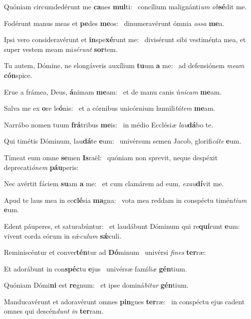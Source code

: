 \item Quóniam circumdedérunt me \textbf{ca}nes \textbf{mul}ti:~\psstar{} concílium malignánti\textit{um} \textit{ob}\textbf{sé}dit me.
\item Fodérunt manus meas et \textbf{pe}des \textbf{me}os:~\psstar{} dinumeravérunt ómnia \textit{ossa} \textbf{me}a.
\item Ipsi vero consideravérunt et \textbf{in}spe\textbf{xé}runt me:~\psstar{} divisérunt sibi vestiménta mea, et super vestem meam mi\textit{sérunt} \textbf{sor}tem.
\item Tu autem, Dómine, ne elongáveris auxílium \textbf{tu}um \textbf{a} me:~\psstar{} ad defensiónem \textit{meam} \textbf{cón}spice.
\item Erue a frámea, Deus, \textbf{á}nimam \textbf{me}am:~\psstar{} et de manu canis ú\textit{nicam} \textbf{me}am.
\item Salva me ex \textbf{o}re le\textbf{ó}nis:~\psstar{} et a córnibus unicórnium humili\textit{tátem} \textbf{me}am.
\item Narrábo nomen tuum \textbf{frá}tribus \textbf{me}is:~\psstar{} in médio Ecclési\textit{æ} \textit{lau}\textbf{dá}bo te.
\item Qui timétis Dóminum, lau\textbf{dá}te \textbf{e}um:~\psstar{} univérsum semen Jacob, glorifi\textit{cáte} \textbf{e}um.
\item Tímeat eum omne \textbf{se}men \textbf{Is}raël:~\psstar{} quóniam non sprevit, neque despéxit deprecati\textit{ónem} \textbf{páu}peris:
\item Nec avértit fáciem \textbf{su}am \textbf{a} me:~\psstar{} et cum clamárem ad eum, \textit{exau}\textbf{dí}vit me.
\item Apud te laus mea in ec\textbf{clé}sia \textbf{ma}gna:~\psstar{} vota mea reddam in conspéctu timén\textit{tium} \textbf{e}um.
\item Edent páuperes, et saturabúntur:~\pscross{} et laudábunt Dóminum qui re\textbf{quí}runt \textbf{e}um:~\psstar{} vivent corda eórum in sǽ\textit{culum} \textbf{sǽ}culi.
\item Reminiscéntur et conver\textbf{tén}tur ad \textbf{Dó}minum~\psstar{} univérsi \textit{fines} \textbf{ter}ræ:
\item Et adorábunt in con\textbf{spéc}tu \textbf{e}jus~\psstar{} univérsæ famí\textit{liæ} \textbf{gén}tium.
\item Quóniam Dómi\textbf{ni} est \textbf{re}gnum:~\psstar{} et ipse dominá\textit{bitur} \textbf{gén}tium.
\item Manducavérunt et adoravérunt omnes \textbf{pin}gues \textbf{ter}ræ:~\psstar{} in conspéctu ejus cadent omnes qui descén\textit{dunt} \textit{in} \textbf{ter}ram.
